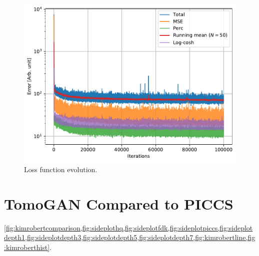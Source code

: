 \begin{figure}[htbp]
  \centering
  \includegraphics[width=.85\textwidth]{figures/losstomo00058ns32itd4mse035logcosh3depth1.pdf}
  \caption[Loss function evolution]{Loss function evolution. } 
  \label{fig:losstomo00058noadv}
\end{figure}


\section{TomoGAN Compared to PICCS}

\cref{fig:kimrobertcomparison,fig:sideplothq,fig:sideplotfdk,fig:sideplotpiccs,fig:sideplotdepth1,fig:sideplotdepth3,fig:sideplotdepth5,fig:sideplotdepth7,fig:kimrobertline,fig:kimroberthist}. 

